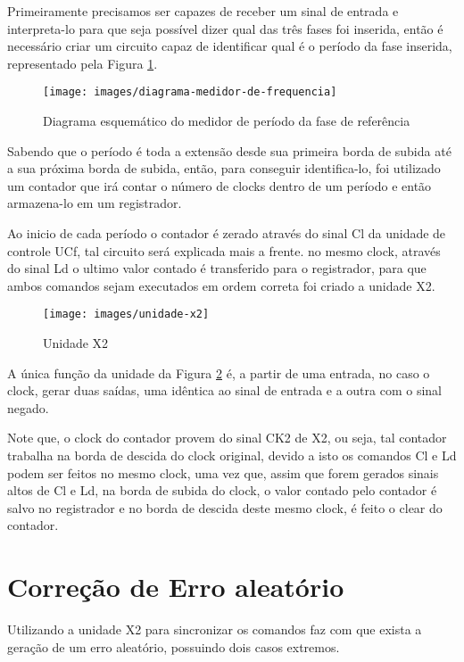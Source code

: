 \documentclass[12pt,a4paper,openany]{abntex2}
\begin{document}
Primeiramente precisamos ser capazes de receber um sinal de entrada e interpreta-lo para que seja possível dizer qual das três fases foi inserida, então é necessário criar um circuito capaz de identificar qual é o período da fase inserida, representado pela Figura \ref{fig:diagrama-medidor-de-frequencia}.

\begin{figure}[!htp]
	\centering
	\caption{Diagrama esquemático do medidor de período da fase de referência}
	\texttt{[image: images/diagrama-medidor-de-frequencia]}
	\label{fig:diagrama-medidor-de-frequencia}
\end{figure}

Sabendo que o período é toda a extensão desde sua primeira
borda de subida até a sua próxima borda de subida, então, para conseguir identifica-lo, foi utilizado um contador que irá contar o número de clocks dentro de um período e então armazena-lo em um registrador.

Ao inicio de cada período o contador é zerado através do sinal Cl da unidade de controle UCf, tal circuito será explicada mais a frente. no mesmo clock, através do sinal Ld o ultimo valor contado é transferido para o registrador, para que ambos comandos sejam executados em ordem correta foi criado a unidade X2.

\begin{figure}[!htp]
	\centering
	\caption{Unidade X2}
	\texttt{[image: images/unidade-x2]}
	\label{fig:unidade-x2}
\end{figure}

A única função da unidade da Figura \ref{fig:unidade-x2} é, a partir de uma entrada, no caso o clock, gerar duas saídas, uma idêntica ao sinal de entrada e a outra com o sinal negado.

Note que, o clock do contador provem do sinal CK2 de X2, ou seja, tal contador trabalha na borda de descida do clock original, devido a isto os comandos Cl e Ld podem ser feitos no mesmo clock, uma vez que, assim que forem gerados sinais altos de Cl e Ld, na borda de subida do clock, o valor contado pelo contador é salvo no registrador e no borda de descida deste mesmo clock, é feito o clear do contador.

\section{Correção de Erro aleatório}

Utilizando a unidade X2 para sincronizar os comandos faz com que exista a geração de um erro aleatório, possuindo dois casos extremos.
\end{document}
